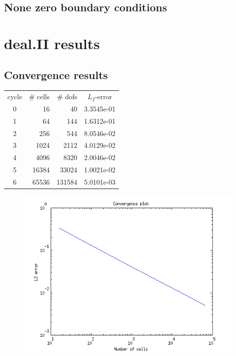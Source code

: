 \documentclass[14pt]{extarticle}
\numberwithin{equation}{section}    %
\begin{document}
 \subsection{None zero boundary conditions}
%

\section{deal.II results}

\subsection{Convergence results}

\begin{table}[H]
\begin{center}
\begin{tabular}{|c|r|r|c|} \hline
cycle & \# cells & \# dofs & $L_2$-error\\
0 & 16 & 40 & 3.3545e-01\\
1 & 64 & 144 & 1.6312e-01\\
2 & 256 & 544 & 8.0546e-02\\
3 & 1024 & 2112 & 4.0129e-02\\
4 & 4096 & 8320 & 2.0046e-02\\
5 & 16384 & 33024 & 1.0021e-02\\
6 & 65536 & 131584 & 5.0101e-03\\
\hline
\end{tabular}
\end{center}
\end{table}



\begin{figure}[h!]
\centering
\includegraphics[width=15cm]{ConvergencePlot}
\end{figure}
\end{document}
